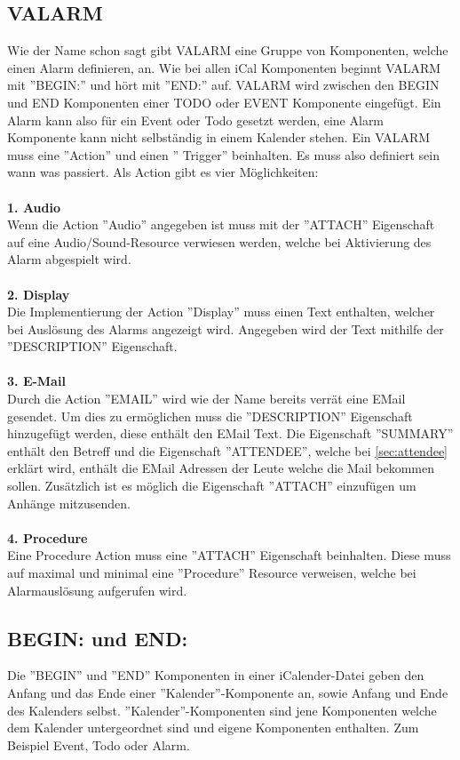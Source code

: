 \subsection{VALARM}
\label{sec:vAlarm} 
Wie der Name schon sagt gibt VALARM eine Gruppe von Komponenten, welche einen Alarm definieren, an.  Wie bei allen iCal Komponenten beginnt VALARM mit ''BEGIN:'' und hört mit ''END:'' auf. VALARM wird zwischen den BEGIN und END Komponenten einer TODO oder EVENT Komponente eingefügt. Ein Alarm kann also für ein Event oder Todo gesetzt werden, eine Alarm Komponente kann nicht selbständig in einem Kalender stehen. Ein VALARM muss eine ''Action'' und einen '' Trigger'' beinhalten. Es muss also definiert sein wann was passiert. Als Action gibt es vier Möglichkeiten: \\ \\
\textbf{1. Audio} \\
Wenn die Action ''Audio'' angegeben ist muss mit der ''ATTACH'' Eigenschaft auf eine Audio/Sound-Resource verwiesen werden, welche bei Aktivierung des Alarm abgespielt wird. \\ \\
\textbf{2. Display} \\ 
Die Implementierung der Action ''Display'' muss einen Text enthalten, welcher bei Auslösung des Alarms angezeigt wird. Angegeben wird der Text mithilfe der ''DESCRIPTION'' Eigenschaft. \\ \\
\textbf{3. E-Mail} \\ 
Durch die Action ''EMAIL'' wird wie der Name bereits verrät eine EMail gesendet. Um dies zu ermöglichen muss die ''DESCRIPTION'' Eigenschaft hinzugefügt werden, diese enthält den EMail Text. Die Eigenschaft ''SUMMARY'' enthält den Betreff und die Eigenschaft ''ATTENDEE'', welche bei \ref{sec:attendee} erklärt wird, enthält die EMail Adressen der Leute welche die Mail bekommen sollen. Zusätzlich ist es möglich die Eigenschaft ''ATTACH'' einzufügen um Anhänge mitzusenden. \\ \\
\textbf{4. Procedure} \\ %
Eine Procedure Action muss eine ''ATTACH'' Eigenschaft beinhalten. Diese muss auf maximal und minimal eine ''Procedure'' Resource verweisen, welche bei Alarmauslösung aufgerufen wird.
\subsection{BEGIN: und END:}
\label{sec:beginUndEnd} 
Die ''BEGIN'' und ''END'' Komponenten in einer iCalender-Datei geben den Anfang und das Ende einer ''Kalender''-Komponente an, sowie Anfang und Ende des Kalenders selbst. ''Kalender''-Komponenten sind jene Komponenten welche dem Kalender untergeordnet sind und eigene Komponenten enthalten. Zum Beispiel Event, Todo oder Alarm. 
